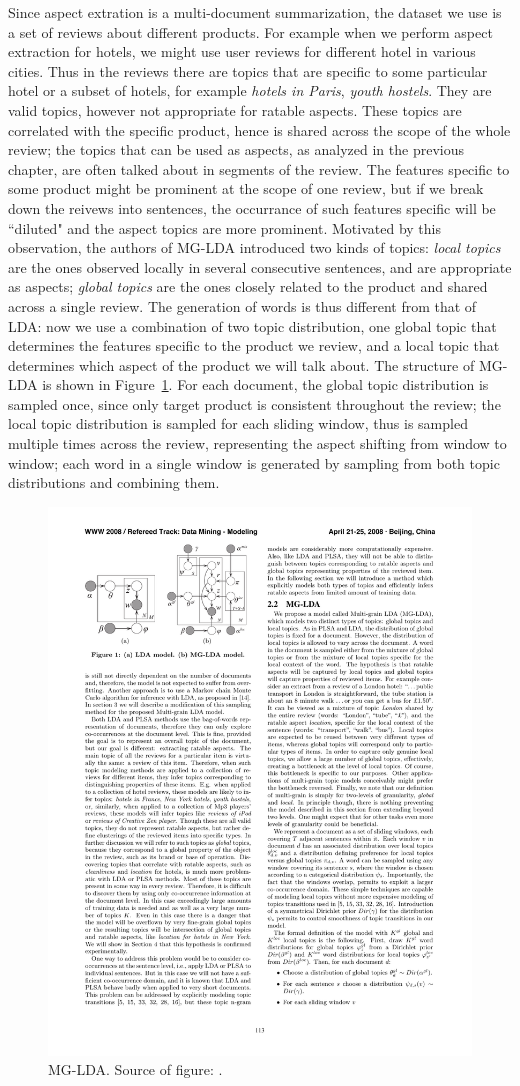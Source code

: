 Since aspect extration is a multi-document summarization, the dataset we use is a set of reviews about different products. For example when we perform aspect extraction for hotels, we might use user reviews for different hotel in various cities. Thus in the reviews there are topics that are specific to some particular hotel or a subset of hotels, for example \emph{hotels in Paris}, \emph{youth hostels}. They are valid topics, however not appropriate for ratable aspects. These topics are correlated with the specific product, hence is shared across the scope of the whole review; the topics that can be used as aspects, as analyzed in the previous chapter, are often talked about in segments of the review. The features specific to some product might be prominent at the scope of one review, but if we break down the reivews into sentences, the occurrance of such features specific will be ``diluted" and the aspect topics are more prominent. Motivated by this observation, the authors of MG-LDA \cite{titov2008modeling} introduced two kinds of topics: \emph{local topics} are the ones observed locally in several consecutive sentences, and are appropriate as aspects; \emph{global topics} are the ones closely related to the product and shared across a single review. The generation of words is thus different from that of LDA: now we use a combination of two topic distribution, one global topic that determines the features specific to the product we review, and a local topic that determines which aspect of the product we will talk about. The structure of MG-LDA is shown in Figure~\ref{fig:methods:MG-LDA}. For each document, the global topic distribution is sampled once, since only target product is consistent throughout the review; the local topic distribution is sampled for each sliding window, thus is sampled multiple times across the review, representing the aspect shifting from window to window; each word in a single window is generated by sampling from both topic distributions and combining them.
\begin{figure}
\centering
\includegraphics[width=0.5\columnwidth]{figures/methods/MG-LDA}
\caption{MG-LDA. Source of figure: \cite{titov2008modeling}.}
\label{fig:methods:MG-LDA}
\end{figure}

